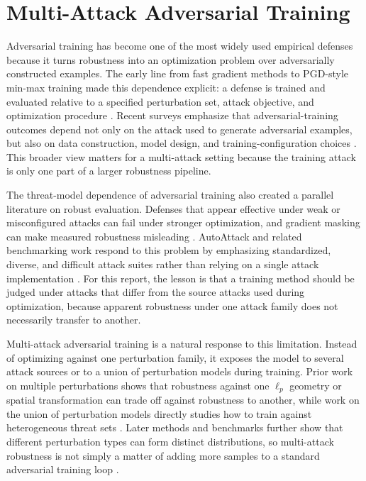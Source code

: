 \section{Multi-Attack Adversarial Training}

Adversarial training has become one of the most widely used empirical defenses
because it turns robustness into an optimization problem over adversarially
constructed examples. The early line from fast gradient methods to PGD-style
min-max training made this dependence explicit: a defense is trained and
evaluated relative to a specified perturbation set, attack objective, and
optimization procedure \cite{goodfellow2015explaining,madry2019towards}.
Recent surveys emphasize that adversarial-training outcomes depend not only on
the attack used to generate adversarial examples, but also on data construction,
model design, and training-configuration choices
\cite{zhao2024adversarialtraining}. This broader view matters for a
multi-attack setting because the training attack is only one part of a larger
robustness pipeline.

The threat-model dependence of adversarial training also created a parallel
literature on robust evaluation. Defenses that appear effective under weak or
misconfigured attacks can fail under stronger optimization, and gradient
masking can make measured robustness misleading
\cite{uesato2018adversarial,athalye2018obfuscated}. AutoAttack and related
benchmarking work respond to this problem by emphasizing standardized,
diverse, and difficult attack suites rather than relying on a single attack
implementation \cite{croce2020reliable,dai2023multirobustbench}. For this
report, the lesson is that a training method should be judged under attacks
that differ from the source attacks used during optimization, because apparent
robustness under one attack family does not necessarily transfer to another.

Multi-attack adversarial training is a natural response to this limitation.
Instead of optimizing against one perturbation family, it exposes the model to
several attack sources or to a union of perturbation models during training.
Prior work on multiple perturbations shows that robustness against one
\(\ell_p\) geometry or spatial transformation can trade off against robustness
to another, while work on the union of perturbation models directly studies
how to train against heterogeneous threat sets
\cite{tramer2019adversarial,maini2020adversarial}. Later methods and
benchmarks further show that different perturbation types can form distinct
distributions, so multi-attack robustness is not simply a matter of adding more
samples to a standard adversarial training loop
\cite{maini2022perturbation,dai2023multirobustbench}.

